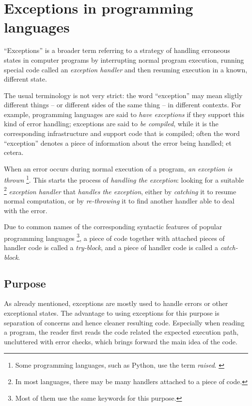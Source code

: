 \chapter{Exceptions in programming languages}

``Exceptions'' is a broader term referring to a strategy of handling erroneous
states in computer programs by interrupting normal program execution, running special
code called an \emph{exception handler} and then resuming execution in a known, different
state.

The usual terminology is not very strict: the word ``exception'' may mean sligtly
different things -- or different sides of the same thing -- in different contexts.
For example, programming languages are said to \emph{have exceptions} if they support
this kind of error handling; exceptions are said to \emph{be compiled}, while it is the
corresponding infrastructure and support code that is compiled; often the word ``exception''
denotes a piece of information about the error being handled; et cetera.

When an error occurs during normal execution of a program, \emph{an exception is thrown}%
\footnote{Some programming languages, such as Python, use the term \emph{raised}.%
\cite{python:reference}}.
This starts the
process of \emph{handling the exception}: looking for a suitable%
\footnote{In most languages, there may be many handlers attached to a piece of code.}
\emph{exception handler} that \emph{handles the exception}, either by \emph{catching} it
to resume normal computation, or by \emph{re-throwing} it to find another handler
able to deal with the error.

Due to common names of the corresponding syntactic features of popular programming languages%
\footnote{Most of them use the same keywords for this purpose.},
a piece of code together with attached pieces of handler code is called a \emph{try-block},
and a piece of handler code is called a \emph{catch-block}.


\section{Purpose}

As already mentioned, exceptions are mostly used to handle errors or other exceptional
states. The advantage to using
exceptions for this purpose is separation of concerns and hence cleaner resulting code.
Especially when reading a program, the reader first reads the code related the expected
execution path, uncluttered with error checks, which brings forward the main idea
of the code.

